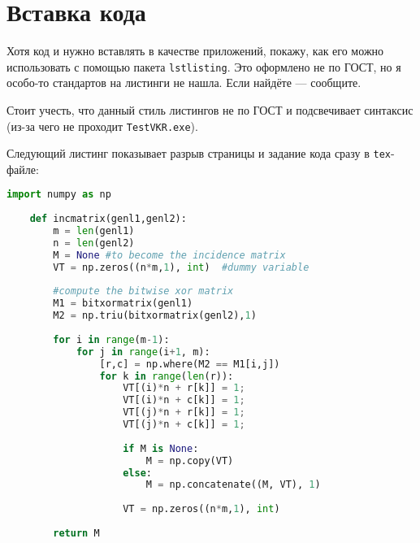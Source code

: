 \section{Вставка кода}

Хотя код и нужно вставлять в качестве приложений, покажу, как его можно использовать с помощью пакета \texttt{lstlisting}. Это оформлено не по ГОСТ, но я особо-то стандартов на листинги не нашла. Если найдёте --- сообщите.


Стоит учесть, что данный стиль листингов не по ГОСТ и подсвечивает синтаксис (из-за чего не проходит \texttt{TestVKR.exe}).

Следующий листинг показывает разрыв страницы и задание кода сразу в \texttt{tex}-файле:

\begin{lstlisting}[frame=rlbt,language=Python,caption={Длинный листинг}]
    import numpy as np
        
    def incmatrix(genl1,genl2):
        m = len(genl1)
        n = len(genl2)
        M = None #to become the incidence matrix
        VT = np.zeros((n*m,1), int)  #dummy variable
        
        #compute the bitwise xor matrix
        M1 = bitxormatrix(genl1)
        M2 = np.triu(bitxormatrix(genl2),1) 
    
        for i in range(m-1):
            for j in range(i+1, m):
                [r,c] = np.where(M2 == M1[i,j])
                for k in range(len(r)):
                    VT[(i)*n + r[k]] = 1;
                    VT[(i)*n + c[k]] = 1;
                    VT[(j)*n + r[k]] = 1;
                    VT[(j)*n + c[k]] = 1;
                    
                    if M is None:
                        M = np.copy(VT)
                    else:
                        M = np.concatenate((M, VT), 1)
                    
                    VT = np.zeros((n*m,1), int)
        
        return M
    \end{lstlisting}